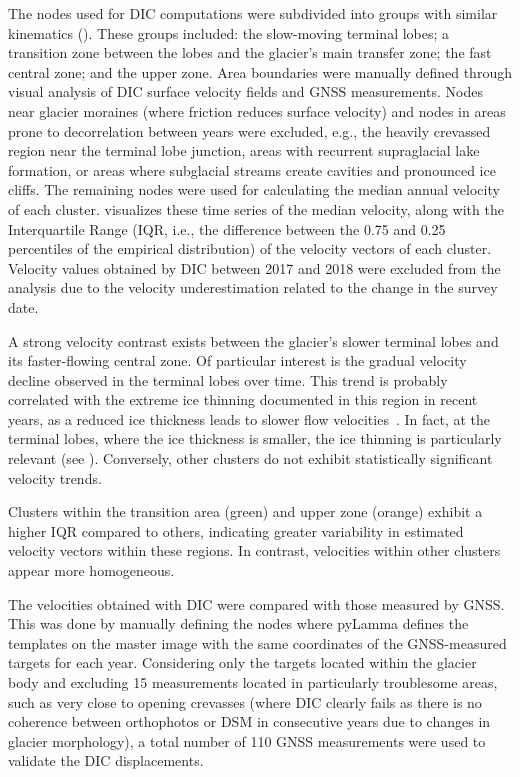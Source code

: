 The nodes used for DIC computations were subdivided into groups with similar kinematics (). 
These groups included: the slow-moving terminal lobes; a transition zone between the lobes and the glacier's main transfer zone; the fast central zone; and the upper zone.  
Area boundaries were manually defined through visual analysis of DIC surface velocity fields and GNSS measurements.
Nodes near glacier moraines (where friction reduces surface velocity) and nodes in areas prone to decorrelation between years were excluded, e.g., the heavily crevassed region near the terminal lobe junction, areas with recurrent supraglacial lake formation, or areas where subglacial streams create cavities and pronounced ice cliffs.
The remaining nodes were used for calculating the median annual velocity of each cluster. 
 visualizes these time series of the median velocity, along with the Interquartile Range (IQR, i.e., the difference between the 0.75 and 0.25 percentiles of the empirical distribution) of the velocity vectors of each cluster.
Velocity values obtained by DIC between 2017 and 2018 were excluded from the analysis due to the velocity underestimation related to the change in the survey date. 

A strong velocity contrast exists between the glacier's slower terminal lobes and its faster-flowing central zone.  
Of particular interest is the gradual velocity decline observed in the terminal lobes over time. 
This trend is probably correlated with the extreme ice thinning documented in this region in recent years, as a reduced ice thickness leads to slower flow velocities~\citep{Cuffey2010_physics_glaciers,jiskoot2011dynamics_glacier}. 
In fact, at the terminal lobes, where the ice thickness is smaller, the ice thinning is particularly relevant (see ).
Conversely, other clusters do not exhibit statistically significant velocity trends.

Clusters within the transition area (green) and upper zone (orange) exhibit a higher IQR compared to others, indicating greater variability in estimated velocity vectors within these regions. In contrast, velocities within other clusters appear more homogeneous.

The velocities obtained with DIC were compared with those measured by GNSS.
This was done by manually defining the nodes where pyLamma defines the templates on the master image with the same coordinates of the GNSS-measured targets for each year.
Considering only the targets located within the glacier body and excluding 15 measurements located in particularly troublesome areas, such as very close to opening crevasses (where DIC clearly fails as there is no coherence between orthophotos or DSM in consecutive years due to changes in glacier morphology), a total number of 110 GNSS measurements were used to validate the DIC displacements.

